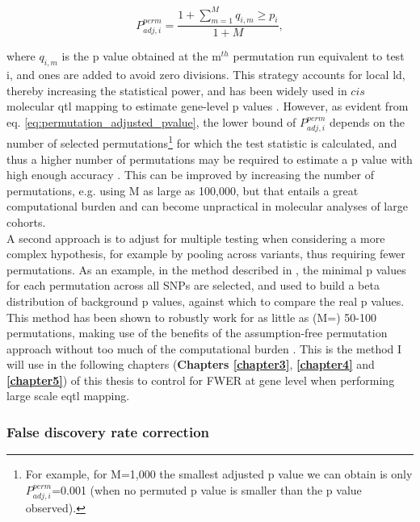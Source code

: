 \begin{equation}\label{eq:permutation_adjusted_pvalue}
    P_{adj,i}^{perm} = \frac{1+\sum_{m=1}^{M} q_{i,m} \geq p_i}{1+M},
\end{equation}

where $q_{i,m}$ is the p value obtained at the m$^{th}$ permutation run equivalent to test i, and ones are added to avoid zero divisions.  
This strategy accounts for local \gls{ld}, thereby increasing the statistical power, and has been widely used in $cis$ molecular \gls{qtl} mapping to estimate gene-level p values \cite{gtex2015genotype, sudmant2015integrated}. 
However, as evident from eq. \eqref{eq:permutation_adjusted_pvalue}, the lower bound of $P_{adj,i}^{perm}$ depends on the number of selected permutations\footnote{For example, for M=1,000 the smallest adjusted p value we can obtain is only $P_{adj,i}^{perm}$=0.001 (when no permuted p value is smaller than the p value observed).} for which the test statistic is calculated, and thus a higher number of permutations may be required to estimate a p value with high enough accuracy \cite{sul2015accurate}.
This can be improved by increasing the number of permutations, e.g. using M as large as 100,000, but that entails a great computational burden and can become unpractical in molecular analyses of large cohorts.
\\

A second approach is to adjust for multiple testing when considering a more complex hypothesis, for example by pooling across variants, thus requiring fewer permutations.
As an example, in the method described in \cite{ongen2016fast}, the minimal p values for each permutation across all SNPs are selected, and used to build a beta distribution of background p values, against which to compare the real p values.
This method has been shown to robustly work for as little as (M=) 50-100 permutations, making use of the benefits of the assumption-free permutation approach without too much of the computational burden \cite{ongen2016fast}. 
This is the method I will use in the following chapters (\textbf{Chapters \ref{chapter3}}, \textbf{\ref{chapter4}} and \textbf{\ref{chapter5}}) of this thesis to control for FWER at gene level when performing large scale \gls{eqtl} mapping.

\subsubsection{False discovery rate correction}

